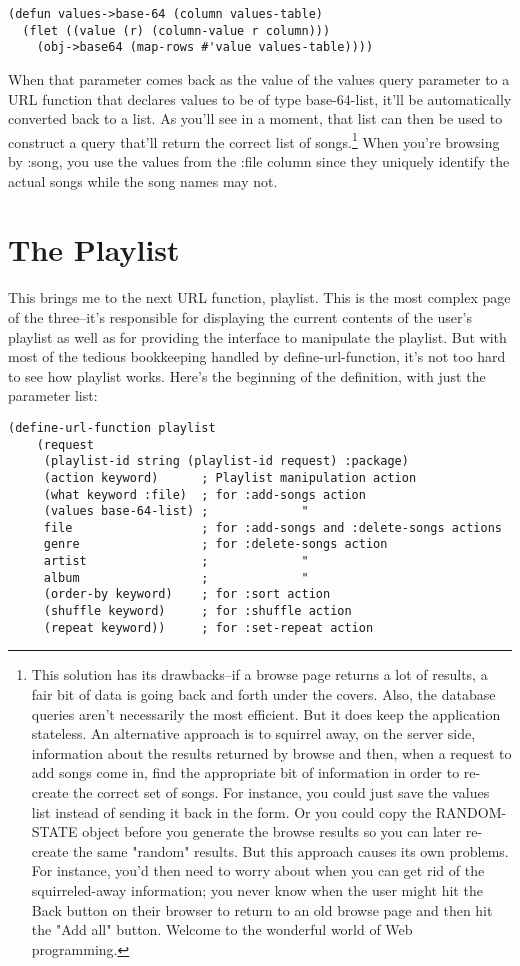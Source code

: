 \begin{lstlisting}
(defun values->base-64 (column values-table)
  (flet ((value (r) (column-value r column)))
    (obj->base64 (map-rows #'value values-table))))
\end{lstlisting}

When that parameter comes back as the value of the values query parameter to a URL
function that declares values to be of type base-64-list, it'll be automatically converted
back to a list. As you'll see in a moment, that list can then be used to construct a query
that'll return the correct list of songs.\footnote{This solution has its drawbacks--if a
  browse page returns a lot of results, a fair bit of data is going back and forth under
  the covers. Also, the database queries aren't necessarily the most efficient. But it
  does keep the application stateless. An alternative approach is to squirrel away, on the
  server side, information about the results returned by browse and then, when a request
  to add songs come in, find the appropriate bit of information in order to re-create the
  correct set of songs. For instance, you could just save the values list instead of
  sending it back in the form. Or you could copy the RANDOM-STATE object before you
  generate the browse results so you can later re-create the same "random" results. But
  this approach causes its own problems. For instance, you'd then need to worry about when
  you can get rid of the squirreled-away information; you never know when the user might
  hit the Back button on their browser to return to an old browse page and then hit the
  "Add all" button. Welcome to the wonderful world of Web programming.} When you're
browsing by :song, you use the values from the :file column since they uniquely identify
the actual songs while the song names may not.

\section{The Playlist}

This brings me to the next URL function, playlist. This is the most complex page of the
three--it's responsible for displaying the current contents of the user's playlist as well
as for providing the interface to manipulate the playlist. But with most of the tedious
bookkeeping handled by define-url-function, it's not too hard to see how playlist
works. Here's the beginning of the definition, with just the parameter list:

\begin{lstlisting}
(define-url-function playlist 
    (request
     (playlist-id string (playlist-id request) :package)
     (action keyword)      ; Playlist manipulation action
     (what keyword :file)  ; for :add-songs action
     (values base-64-list) ;             "
     file                  ; for :add-songs and :delete-songs actions
     genre                 ; for :delete-songs action
     artist                ;             "
     album                 ;             "
     (order-by keyword)    ; for :sort action
     (shuffle keyword)     ; for :shuffle action
     (repeat keyword))     ; for :set-repeat action
\end{lstlisting}

